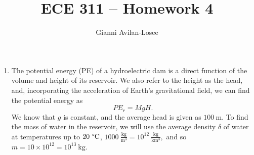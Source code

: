 \documentclass{article}
\title{ECE 311 -- Homework 4}
\author{Gianni Avilan-Losee}
\begin{document}

\begin{enumerate}[label=\thesubsection]
	\setcounter{section}{4}
	\setcounter{subsection}{16}
	\item The potential energy (PE) of a hydroelectric dam is a direct function of the volume and height of its reservoir. We also refer to the height as the head, and, incorporating the acceleration of Earth's gravitational field, we can find the potential energy as 
		\[
			PE_{r} = MgH.
		\]
		We know that \(g\) is constant, and the average head is given as \(100\ \mathrm{m}\). To find the mass of water in the reservoir, we will use the average density \(\delta\) of water at temperatures up to \(20 \ \degree\mathrm{C}\), \(1000 \ \mathrm{\frac{kg}{m^3}} = 10^{12} \ \mathrm{\frac{kg}{km^3}},\) and so \(m = 10 \times 10^{12} = 10^{13} \ \mathrm{kg}\).


\end{enumerate}
\end{document}
